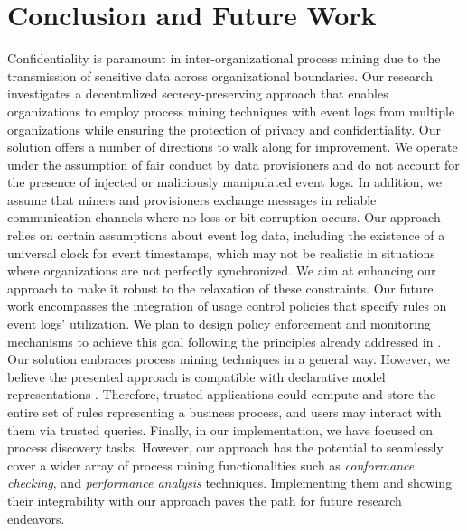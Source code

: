 \section{Conclusion and Future Work}
\label{sec:conclusion}
Confidentiality is paramount in inter-organizational process mining due to the transmission of sensitive data across organizational boundaries. Our research investigates a decentralized secrecy-preserving approach that enables organizations to employ process mining techniques with event logs from multiple organizations while ensuring the protection of privacy and confidentiality. Our solution offers a number of directions %
to walk along for improvement. We operate under the assumption of fair conduct by data provisioners and do not account for the presence of injected or maliciously manipulated event logs. In addition, we assume that miners and provisioners exchange messages in reliable communication channels where no loss or bit corruption occurs. Our approach relies on certain assumptions about event log data, including the existence of a universal clock for event timestamps, which may not be realistic in situations where organizations are not perfectly synchronized. %
We aim at enhancing our approach to make it robust to the relaxation of these constraints.  Our future work encompasses the integration of usage control policies that specify rules on event logs' utilization. We plan to design policy enforcement and monitoring mechanisms to achieve this goal following the principles already addressed in \cite{basile2023blockchain,basile2023solid}. Our solution embraces process mining techniques in a general way. However, we believe the presented approach is compatible with declarative model representations \cite{di2022declarative}. Therefore, trusted applications could compute and store the entire set of rules representing a business process, and users may interact with them via trusted queries. Finally, in our implementation, we have focused on process discovery tasks. However, our approach has the potential to seamlessly cover a wider array of process mining functionalities such as \textit{conformance checking}, and \textit{performance analysis} techniques. Implementing them and showing their integrability with our approach paves the path for future research endeavors.


